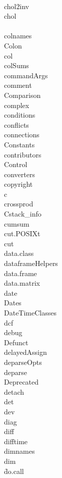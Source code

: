 \documentclass[12pt]{article}
\begin{document}
 \\
{chol2inv} \\
{chol} \\
 \\
{colnames} \\
{Colon} \\
{col} \\
{colSums} \\
{commandArgs} \\
{comment} \\
{Comparison} \\
{complex} \\
{conditions} \\
{conflicts} \\
{connections} \\
{Constants} \\
{contributors} \\
{Control} \\
{converters} \\
{copyright} \\
{c} \\
{crossprod} \\
{Cstack\_info} \\
{cumsum} \\
{cut.POSIXt} \\
{cut} \\
{data.class} \\
{dataframeHelpers} \\
{data.frame} \\
{data.matrix} \\
{date} \\
{Dates} \\
{DateTimeClasses} \\
{dcf} \\
{debug} \\
{Defunct} \\
{delayedAssign} \\
{deparseOpts} \\
{deparse} \\
{Deprecated} \\
{detach} \\
{det} \\
{dev} \\
{diag} \\
{diff} \\
{difftime} \\
{dimnames} \\
{dim} \\
\f{do.call} \\
\end{document}
